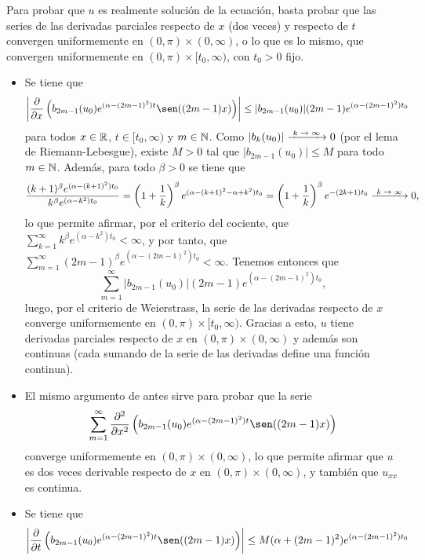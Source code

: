 \documentclass[a4paper, 12pt, extrafontsizes]{memoir}
\begin{document}
\begin{solution}
\begin{enumerate}
    Para probar que $u$ es realmente solución de la ecuación, basta probar que las series de las derivadas parciales respecto de $x$ (dos veces) y respecto de $t$ convergen uniformemente en $(0,\pi) \times (0,\infty)$, o lo que es lo mismo, que convergen uniformemente en $(0,\pi) \times [t_0,\infty)$, con $t_0 > 0$ fijo.
    \begin{itemize}
        \item Se tiene que
        \[\begin{aligned}
            \biggl|\frac{\partial}{\partial x}\left(b_{2m-1}(u_0)e^{(\alpha-(2m-1)^2)t}\sen((2m-1)x)\right)\biggr| &\leq |b_{2m-1}(u_0)|(2m-1)e^{(\alpha-(2m-1)^2)t_0}
        \end{aligned}\]
        para todos $x \in \mathbb R$, $t \in [t_0,\infty)$ y $m \in \mathbb N$. Como $|b_{k}(u_0)| \kconv 0$ (por el lema de Riemann-Lebesgue), existe $M > 0$ tal que $|b_{2m-1}(u_0)| \leq M$ para todo $m \in \mathbb N$. Además, para todo $\beta > 0$ se tiene que
        \[\frac{(k+1)^\beta e^{(\alpha-(k+1)^2)t_0}}{k^\beta e^{(\alpha-k^2)t_0}} = \left(1+\frac{1}{k}\right)^\beta e^{(\alpha-(k+1)^2-\alpha+k^2)t_0} = \left(1+\frac{1}{k}\right)^\beta e^{-(2k+1)t_0} \kconv 0,\]
        lo que permite afirmar, por el criterio del cociente, que $\sum_{k=1}^\infty k^\beta e^{(\alpha-k^2)t_0} < \infty$, y por tanto, que $\sum_{m=1}^\infty(2m-1)^\beta e^{(\alpha-(2m-1)^2)t_0} < \infty$. Tenemos entonces que
        \[\sum_{m=1}^\infty |b_{2m-1}(u_0)|(2m-1)e^{(\alpha-(2m-1)^2)t_0},\]
        luego, por el criterio de Weierstrass, la serie de las derivadas respecto de $x$ converge uniformemente en $(0,\pi) \times [t_0,\infty)$. Gracias a esto, $u$ tiene derivadas parciales respecto de $x$ en $(0,\pi) \times (0,\infty)$ y además son continuas (cada sumando de la serie de las derivadas define una función continua).
        \item El mismo argumento de antes sirve para probar que la serie
        \[\sum_{m=1}^\infty\frac{\partial^2}{\partial x^2}\left(b_{2m-1}(u_0)e^{(\alpha-(2m-1)^2)t}\sen((2m-1)x)\right)\]
        converge uniformemente en $(0,\pi) \times (0,\infty)$, lo que permite afirmar que $u$ es dos veces derivable respecto de $x$ en $(0,\pi) \times (0,\infty)$, y también que $u_{xx}$ es continua.
        \item  Se tiene que
        \[\begin{aligned}
            \biggl|\frac{\partial}{\partial t}\left(b_{2m-1}(u_0)e^{(\alpha-(2m-1)^2)t}\sen((2m-1)x)\right)\biggr| &\leq M(\alpha+(2m-1)^2)e^{(\alpha-(2m-1)^2)t_0}
        \end{aligned}\]

\end{itemize}
\end{enumerate}
\end{solution}
\end{document}
